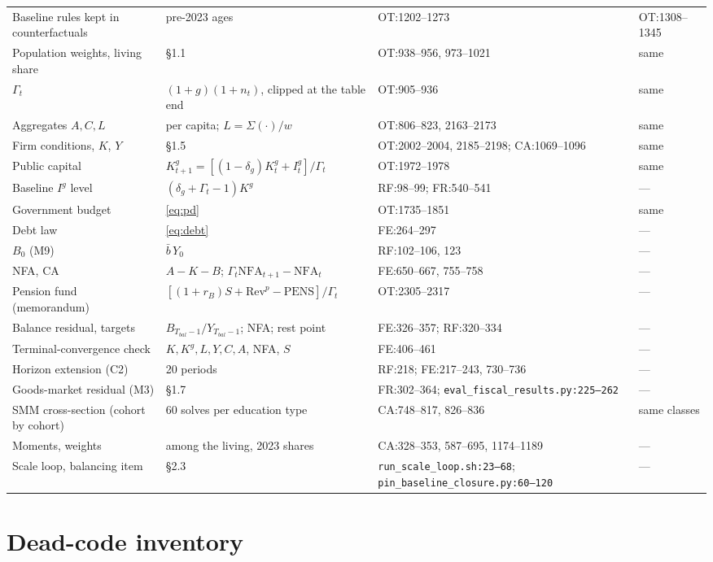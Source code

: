 \documentclass[11pt,a4paper]{article}
\newcommand{\code}[1]{\texttt{#1}}
\begin{document}
\begin{longtable}{@{}p{3.6cm}p{5.3cm}p{3.6cm}p{3.6cm}@{}}
Baseline rules kept in counterfactuals & pre-2023 ages & OT:1202--1273 & OT:1308--1345 \\
Population weights, living share & \S1.1 & OT:938--956, 973--1021 & same \\
$\Gamma_t$ & $(1+g)(1+n_t)$, clipped at the table end & OT:905--936 & same \\
Aggregates $A, C, L$ & per capita; $L = \Sigma(\cdot)/w$ & OT:806--823, 2163--2173 & same \\
Firm conditions, $K$, $Y$ & \S1.5 & OT:2002--2004, 2185--2198; CA:1069--1096 & same \\
Public capital & $K^g_{t+1} = [(1-\delta_g)K^g_t + I^g_t]/\Gamma_t$ & OT:1972--1978 & same \\
Baseline $I^g$ level & $(\delta_g + \Gamma_t - 1)K^g$ & RF:98--99; FR:540--541 & --- \\
Government budget & \eqref{eq:pd} & OT:1735--1851 & same \\
Debt law & \eqref{eq:debt} & FE:264--297 & --- \\
$B_0$ (M9) & $\bar b\,Y_0$ & RF:102--106, 123 & --- \\
NFA, CA & $A - K - B$; $\Gamma_t \mathrm{NFA}_{t+1} - \mathrm{NFA}_t$ & FE:650--667, 755--758 & --- \\
Pension fund (memorandum) & $[(1+r_B)S + \mathrm{Rev}^p - \mathrm{PENS}]/\Gamma_t$ & OT:2305--2317 & --- \\
Balance residual, targets & $B_{T_{bal}-1}/Y_{T_{bal}-1}$; NFA; rest point & FE:326--357; RF:320--334 & --- \\
Terminal-convergence check & $K, K^g, L, Y, C, A$, NFA, $S$ & FE:406--461 & --- \\
Horizon extension (C2) & 20 periods & RF:218; FE:217--243, 730--736 & --- \\
Goods-market residual (M3) & \S1.7 & FR:302--364; \code{eval_fiscal_results.py:225--262} & --- \\
SMM cross-section (cohort by cohort) & 60 solves per education type & CA:748--817, 826--836 & same classes \\
Moments, weights & among the living, 2023 shares & CA:328--353, 587--695, 1174--1189 & --- \\
Scale loop, balancing item & \S2.3 & \code{run_scale_loop.sh:23--68}; \code{pin_baseline_closure.py:60--120} & --- \\
\bottomrule
\end{longtable}
\normalsize

\section{Dead-code inventory}
\end{document}
